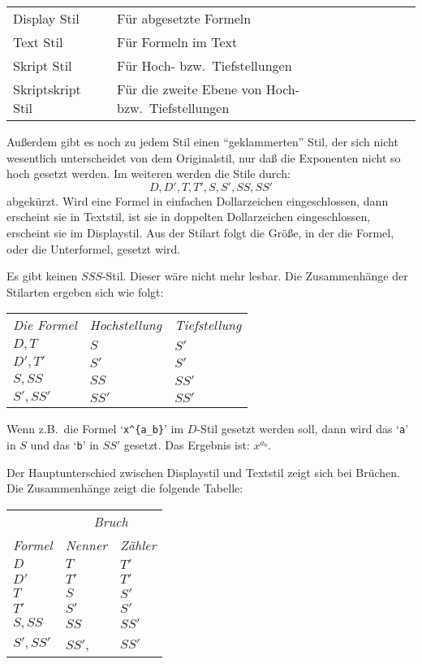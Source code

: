 \medskip\begin{tabular}{ll}
Display Stil & F\"ur abgesetzte Formeln\\
Text Stil & F\"ur Formeln im Text\\
Skript Stil & F\"ur Hoch- bzw.\ Tiefstellungen\\
Skriptskript Stil & F\"ur die zweite Ebene von Hoch- bzw.\
Tiefstellungen
\end{tabular}\medskip{}

Au\ss{}erdem gibt es noch zu jedem Stil einen ``geklammerten'' Stil, der
sich nicht wesentlich unterscheidet von dem Originalstil, nur da\ss{} die
\index{Exponent}
Exponenten nicht so hoch gesetzt werden. Im weiteren werden die Stile
durch:
\[D, D', T, T', S, S', SS, SS'\]
abgek\"urzt. Wird eine Formel in einfachen 
Dollarzeichen eingeschlossen,
dann erscheint sie in Textstil, ist sie in doppelten
Dollarzeichen
eingeschlossen, erscheint sie im 
Displaystil. Aus der Stilart folgt
die Gr\"o\ss{}e, in der die Formel, oder die Unterformel, gesetzt wird.

Es gibt keinen $SSS$-Stil. Dieser w\"are nicht mehr lesbar. Die
Zusammenh\"ange der Stilarten ergeben sich wie folgt:

\medskip\begin{tabular}{lll}
{\em Die Formel} & {\em Hochstellung} & {\em Tiefstellung} \\
$D,T$ & $S$ & $S'$\\
$D',T'$ & $S'$ & $S'$\\
$S,SS$ & $SS$ & $SS'$\\
$S',SS'$ & $SS'$ & $SS'$
\end{tabular}\medskip

Wenn z.B.\ die Formel `\verb|x^{a_b}|' im $D$-Stil gesetzt werden
soll, dann wird das `\verb|a|' in $S$ und das `\verb|b|' in $SS'$
gesetzt. Das Ergebnis ist: $\displaystyle{x^{a_b}}$.

Der Hauptunterschied zwischen 
Displaystil und Textstil zeigt sich bei
Br\"uchen. Die Zusammenh\"ange zeigt die folgende Tabelle:

\medskip\begin{tabular}{lll}
 & \multicolumn{2}{c}{\em Bruch} \\
{\em Formel} & {\em Nenner} & {\em Z\"ahler} \\
$D$ & $T$ & $T'$\\
$D'$ & $T'$ & $T'$\\
$T$ & $S$ & $S'$\\
$T'$ & $S'$ & $S'$\\
$S,SS$ & $SS$ & $SS'$\\
$S',SS'$ & $SS'$, & $SS'$
\end{tabular}\medskip

